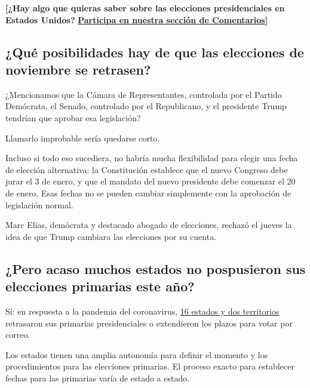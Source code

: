 \textbf{{[}¿Hay algo que quieras saber sobre las elecciones
presidenciales en Estados Unidos?}
\textbf{\href{https://www.nytimes3xbfgragh.onion/es/2020/07/30/espanol/estados-unidos/trump-retrasar-elecciones.html\#commentsContainer}{Participa
en nuestra sección de Comentarios}{]}}

\hypertarget{quuxe9-posibilidades-hay-de-que-las-elecciones-de-noviembre-se-retrasen}{%
\subsection{¿Qué posibilidades hay de que las elecciones de noviembre se
retrasen?}\label{quuxe9-posibilidades-hay-de-que-las-elecciones-de-noviembre-se-retrasen}}

¿Mencionamos que la Cámara de Representantes, controlada por el Partido
Demócrata, el Senado, controlado por el Republicano, y el presidente
Trump tendrían que aprobar esa legislación?

Llamarlo improbable sería quedarse corto.

Incluso si todo eso sucediera, no habría mucha flexibilidad para elegir
una fecha de elección alternativa: la Constitución establece que el
nuevo Congreso debe jurar el 3 de enero, y que el mandato del nuevo
presidente debe comenzar el 20 de enero. Esas fechas no se pueden
cambiar simplemente con la aprobación de legislación normal.

Marc Elias, demócrata y destacado abogado de elecciones, rechazó el
jueves la idea de que Trump cambiara las elecciones por su cuenta.

\hypertarget{pero-acaso-muchos-estados-no-pospusieron-sus-elecciones-primarias-este-auxf1o}{%
\subsection{¿Pero acaso muchos estados no pospusieron sus elecciones
primarias este
año?}\label{pero-acaso-muchos-estados-no-pospusieron-sus-elecciones-primarias-este-auxf1o}}

Sí: en respuesta a la pandemia del coronavirus,
\href{https://www.nytimes3xbfgragh.onion/article/2020-campaign-primary-calendar-coronavirus.html}{16
estados y dos territorios} retrasaron sus primarias presidenciales o
extendieron los plazos para votar por correo.

Los estados tienen una amplia autonomía para definir el momento y los
procedimientos para las elecciones primarias. El proceso exacto para
establecer fechas para las primarias varía de estado a estado.

